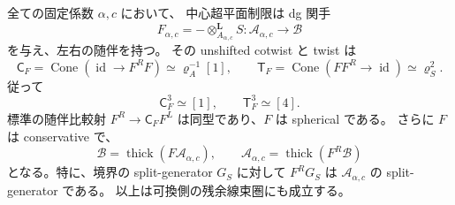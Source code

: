 \begin{proposition}[中心超平面制限の球面性と生成]
\label{cmo:prop:central-linear-spherical}
全ての固定係数 $\alpha,c$ において、
中心超平面制限は dg 関手
\[
 F_{\alpha,c}
   =-\otimes_{A_{\alpha,c}}^{\mathbf L}S:
       \mathcal A_{\alpha,c}\longrightarrow\mathcal B
\]
を与え、左右の随伴を持つ。
その unshifted cotwist と twist は
\begin{equation}\label{cmo:eq:central-linear-periods}
 \mathsf C_F=\operatorname{Cone}(\operatorname{id}\to F^RF)
          \simeq\varrho_A^{-1}[1],\qquad
 \mathsf T_F=\operatorname{Cone}(FF^R\to\operatorname{id})
          \simeq\varrho_S^2.
\end{equation}
従って
\[
 \mathsf C_F^3\simeq[1],\qquad
 \mathsf T_F^3\simeq[4].
\]
標準の随伴比較射 $F^R\to\mathsf C_FF^L$ は同型であり、$F$ は spherical である。
さらに $F$ は conservative で、
\begin{equation}\label{cmo:eq:central-linear-generation}
 \mathcal B=\operatorname{thick}(F\mathcal A_{\alpha,c}),\qquad
 \mathcal A_{\alpha,c}=\operatorname{thick}(F^R\mathcal B)
\end{equation}
となる。特に、境界の split-generator $G_S$ に対して
$F^RG_S$ は $\mathcal A_{\alpha,c}$ の split-generator である。
以上は可換側の残余線束圏にも成立する。
\end{proposition}

